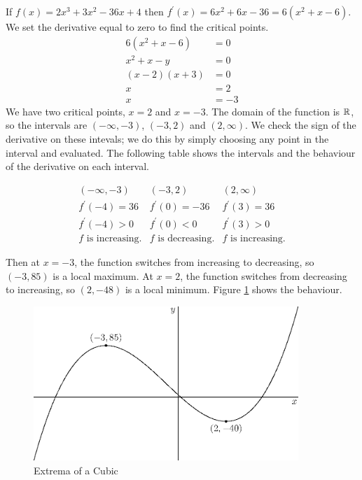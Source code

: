 \documentclass[fleqn]{report}
\begin{document}
\begin{example}
If $f(x) = 2x^3 + 3x^2 - 36x + 4$ then $f^\prime(x) = 6x^2 +
6x - 36 = 6(x^2 + x - 6)$. We set the derivative equal to
zero to find the critical points.
\begin{align*}
6 (x^2 + x - 6) & = 0 \\
x^2 + x - y & = 0 \\
(x-2)(x+3) & = 0 \\
x & = 2 \\
x & = -3
\end{align*}
We have two critical points, $x=2$ and $x=-3$. The domain of
the function is $\mathbb{R}$, so the intervals are $(-\infty,-3)$,
$(-3,2)$ and $(2,\infty)$. We check the sign of the
derivative on these intevals; we do this by simply choosing
any point in the interval and evaluated. The following table
shows the intervals and the behaviour of the derivative on
each interval. 

\begin{displaymath}
\begin{array}{ccc}
(-\infty, -3) & (-3,2) & (2,\infty) \\[1em]
f^\prime(-4) = 36 & f^\prime(0) = -36 &
f^\prime(3) = 36 \\[1em]
f^\prime(-4) > 0 & f^\prime(0) < 0 & f^\prime(3)
> 0 \\[1em]
f \text{ is increasing.} & f \text{ is decreasing.}
& f \text{ is increasing.}
\end{array}
\end{displaymath}

Then at $x=-3$, the function switches from increasing to
decreasing, so $(-3,85)$ is a local maximum. At $x=2$, the
function switches from decreasing to increasing, so $(2,-48)$
is a local minimum. Figure \ref{Cubic Extrema Example} shows
the behaviour.
\end{example}

\begin{figure}[t]
\centering
\includegraphics[width=10cm]{figure55.eps}
\caption{Extrema of a Cubic}
\label{Cubic Extrema Example}
\end{figure}
\end{document}

